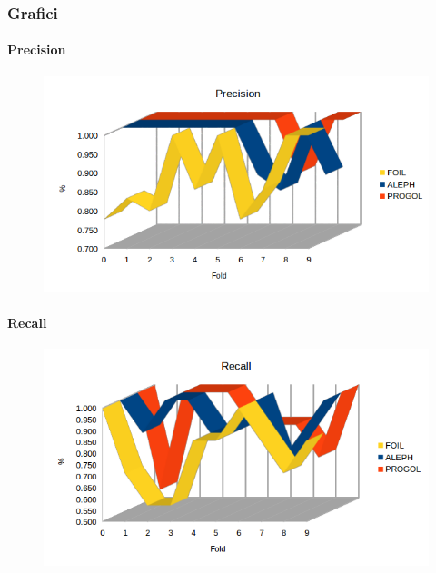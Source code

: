 \subsubsection{Grafici}
\paragraph{Precision}
\begin{figure}[hbtp]
	\includegraphics[width=1.2\textwidth]{img/datasetGraph/svln/precision.png}
	\label{svln-Precision}
\end{figure}
\paragraph{Recall}
\begin{figure}[hbtp]
	\includegraphics[width=1.2\textwidth]{img/datasetGraph/svln/recall.png}
	\label{svln-Recall}
\end{figure}
